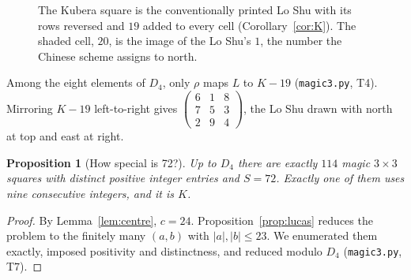 \documentclass[journal]{IEEEtran}
\newtheorem{proposition}[theorem]{Proposition}
\theoremstyle{definition}
\newcommand{\sq}[9]{\begin{smallmatrix}#1&#2&#3\\#4&#5&#6\\#7&#8&#9\end{smallmatrix}}
\begin{document}
\begin{figure}[t]
\centering
{}
\caption{The Kubera square is the conventionally printed Lo Shu with its rows reversed and $19$ added to every cell (Corollary~\ref{cor:K}). The shaded cell, $20$, is the image of the Lo Shu's $1$, the number the Chinese scheme assigns to north.}
\label{fig:LtoK}
\end{figure}
\noindent Among the eight elements of $D_4$, only $\rho$ maps $L$ to $K-19$ (\texttt{magic3.py}, T4). Mirroring $K-19$ left-to-right gives $\left(\sq{6}{1}{8}{7}{5}{3}{2}{9}{4}\right)$, the Lo Shu drawn with north at top and east at right.

\begin{proposition}[How special is 72?]\label{prop:count72}
Up to $D_4$ there are exactly $114$ magic $3\times3$ squares with distinct positive integer entries and $S=72$. Exactly one of them uses nine consecutive integers, and it is $K$.
\end{proposition}
\begin{proof}
By Lemma~\ref{lem:centre}, $c=24$. Proposition~\ref{prop:lucas} reduces the problem to the finitely many $(a,b)$ with $|a|,|b|\le23$. We enumerated them exactly, imposed positivity and distinctness, and reduced modulo $D_4$ (\texttt{magic3.py}, T7).
\end{proof}
\end{document}
